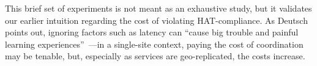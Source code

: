 This brief set of experiments is not meant as an exhaustive study, but
it validates our earlier intuition regarding the cost of violating
HAT-compliance. As Deutsch points out, ignoring factors such as
latency can ``cause big trouble and painful learning
experiences''~\cite{fallacies-deutsch}---in a single-site context,
paying the cost of coordination may be tenable, but, especially as
services are geo-replicated, the costs increase. 
